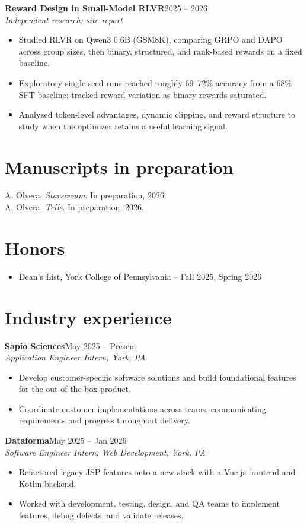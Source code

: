 \documentclass[10pt,letterpaper]{article}
\newcommand{\entry}[3]{\textbf{#1}\hfill #2\\{\itshape #3}\par}
\begin{document}
\entry{Reward Design in Small-Model RLVR}{2025 -- 2026}{Independent research; site report}
\begin{itemize}
\item Studied RLVR on Qwen3 0.6B (GSM8K), comparing GRPO and DAPO across group sizes, then binary, structured, and rank-based rewards on a fixed baseline.
\item Exploratory single-seed runs reached roughly 69--72\% accuracy from a 68\% SFT baseline; tracked reward variation as binary rewards saturated.
\item Analyzed token-level advantages, dynamic clipping, and reward structure to study when the optimizer retains a useful learning signal.
\end{itemize}
\newpage
\section{Manuscripts in preparation}
A. Olvera. \textit{Starscream}. In preparation, 2026.\\
A. Olvera. \textit{Tells}. In preparation, 2026.
\section{Honors}
\begin{itemize}\item Dean's List, York College of Pennsylvania -- Fall 2025, Spring 2026\end{itemize}
\section{Industry experience}
\entry{Sapio Sciences}{May 2025 -- Present}{Application Engineer Intern, York, PA}
\begin{itemize}
\item Develop customer-specific software solutions and build foundational features for the out-of-the-box product.
\item Coordinate customer implementations across teams, communicating requirements and progress throughout delivery.
\end{itemize}
\entry{Dataforma}{May 2025 -- Jan 2026}{Software Engineer Intern, Web Development, York, PA}
\begin{itemize}
\item Refactored legacy JSP features onto a new stack with a Vue.js frontend and Kotlin backend.
\item Worked with development, testing, design, and QA teams to implement features, debug defects, and validate releases.
\end{itemize}
\end{document}
